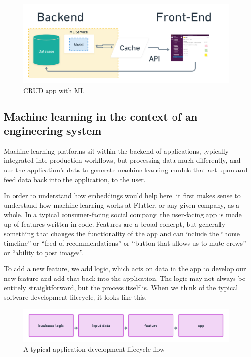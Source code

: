 \documentclass[draft, 11pt]{diazessay} %
\begin{document}
\begin{figure}[!ht]
\centering
\includegraphics[width=\textwidth]{figures/web_service_ml.png}
\caption{CRUD app with ML}
\end{figure}

\subsection{Machine learning in the context of an engineering system}
Machine learning platforms sit within the backend of applications, typically integrated into production workflows, but processing data much differently, and use the application's data to generate machine learning models that act upon and feed data back into the application, to the user. 

In order to understand how embeddings would help here, it first  makes sense to understand how machine learning works at Flutter, or any given company, as a whole. In a typical consumer-facing social company, the user-facing app  is made up of features written in code. Features are a broad concept, but generally something that changes the functionality of the app and can include the “home timeline” or “feed of recommendations” or “button that allows us to mute crows” or “ability to post images”. 

To add a new feature,  we add logic, which acts on data in the app to develop our new feature and add that back into the application. The logic may not always be entirely straightforward, but the process itself is. When we think of the typical software development lifecycle, it looks like this.

\begin{figure}[!ht]
\centering
\includegraphics[width=.75\textwidth]{figures/app_flow.png}
\caption{A typical application development lifecycle flow }
\end{figure}
\end{document}
